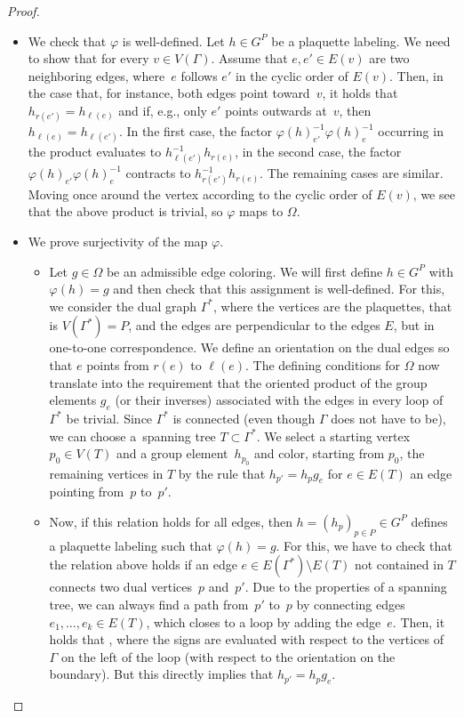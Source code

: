 \documentclass[10pt,a4paper]{amsart}
\numberwithin{equation}{section}
\theoremstyle{definition}
\begin{document}
\begin{proof}
\begin{itemize}\itemsep=0pt
 \item We check that $\varphi$ is well-defined. Let $h \in G^P$ be a plaquette labeling. We need to show that  for every $v \in V(\Gamma)$. Assume that $e, e' \in E(v)$ are two neighboring edges, where~$e$ follows $e'$ in the cyclic order of $E(v)$. Then, in the case that, for instance, both edges point toward~$v$, it holds that $h_{r(e')} = h_{\ell(e)}$ and if, e.g., only $e'$ points outwards at~$v$, then $h_{\ell(e)} = h_{\ell(e')}$. In the first case, the factor $\varphi(h)_{e'}^{-1}\varphi(h)_e^{-1}$ occurring in the product evaluates to $h_{\ell(e')}^{-1}h_{r(e)}$, in the second case, the factor $\varphi(h)_{e'}\varphi(h)_e^{-1}$ contracts to $h_{r(e')}^{-1}h_{r(e)}$. The remaining cases are similar. Moving once around the vertex according to the cyclic order of $E(v)$, we see that the above product is trivial, so $\varphi$ maps to $\Omega$.
 \item We prove surjectivity of the map $\varphi$.
 \begin{itemize}\itemsep=0pt
 \item Let $g \in \Omega$ be an admissible edge coloring. We will first define $h \in G^P$ with $\varphi(h) = g$ and then check that this assignment is well-defined. For this, we consider the dual graph $\Gamma^*$, where the vertices are the plaquettes, that is $V(\Gamma^*) = P$, and the edges are perpendicular to the edges $E$, but in one-to-one correspondence. We define an orientation on the dual edges so that $e$ points from $r(e)$ to $\ell(e)$. The defining conditions for $\Omega$ now translate into the requirement that the oriented product of the group elements $g_e$ (or their inverses) associated with the edges in every loop of~$\Gamma^*$ be trivial. Since $\Gamma^*$ is connected (even though $\Gamma$ does not have to be), we can choose a~spanning tree $T \subset \Gamma^*$. We select a starting vertex $p_0 \in V(T)$ and a group element~$h_{p_0}$ and color, starting from $p_0$, the remaining vertices in $T$ by the rule that $h_{p'} = h_pg_e$ for $e \in E(T)$ an edge pointing from~$p$ to~$p'$.
 \item Now, if this relation holds for all edges, then $h = (h_p)_{p \in P} \in G^P$ defines a plaquette labeling such that $\varphi(h) = g$. For this, we have to check that the relation above holds if an edge $e \in E(\Gamma^*)\setminus E(T)$ not contained in $T$ connects two dual vertices~$p$ and~$p'$. Due to the properties of a spanning tree, we can always find a path from~$p'$ to~$p$ by connecting edges $e_1, \dots, e_k \in E(T)$, which closes to a loop by adding the edge~$e$. Then, it holds that , where the signs are evaluated with respect to the vertices of $\Gamma$ on the left of the loop (with respect to the orientation on the boundary). But this directly implies that $h_{p'} = h_pg_e$.
 \end{itemize}


\end{itemize}
\end{proof}
\end{document}
